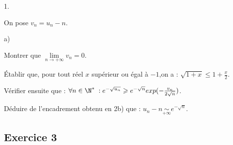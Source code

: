 \documentclass[11pt]{article}%
\begin{document}
\begin{noliste}{1.}

\item On pose $v_{n} = u_{n}-n$.

\begin{noliste}{a)}
 \setlength{\itemsep}{2mm}
\item Montrer que $\underset{n\to + \infty}{\lim}v_{n} = 0$. 
\item Établir que, pour tout réel $x$ supérieur ou égal à $-1$,on a :
$\sqrt{1 + x}\leq1 + \frac{x}{2}$. 
\item Vérifier ensuite que : $\forall n\in\N^{*}\;
:e^{-\sqrt{u_{n}}}\geq e^{-\sqrt{n}}exp(-\frac{v_{n}}{2\sqrt{n}})$. 
\item Déduire de l'encadrement obtenu en 2b) que : $u_{n}-n\underset{+
\infty}{\sim}e^{-\sqrt{n}}$. 
\end{noliste}
\end{noliste}

\subsection*{{\normalsize{}{}Exercice 3}}
\end{document}
